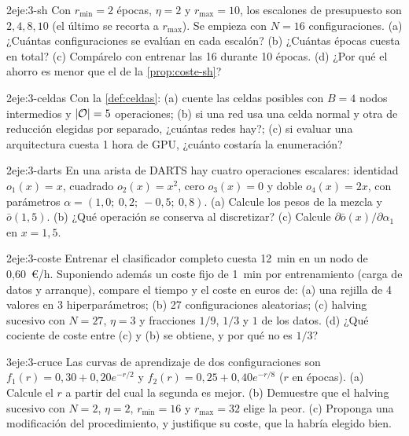 \begin{ejercicio}{2}{eje:3-sh}
Con $r_{\min}=2$ épocas, $\eta=2$ y $r_{\max}=10$, los escalones de presupuesto son $2,4,8,10$ (el último se recorta a $r_{\max}$). Se empieza con $N=16$ configuraciones. (a) ¿Cuántas configuraciones se evalúan en cada escalón? (b) ¿Cuántas épocas cuesta en total? (c) Compárelo con entrenar las 16 durante 10 épocas. (d) ¿Por qué el ahorro es menor que el de la \cref{prop:coste-sh}?
\end{ejercicio}

\begin{ejercicio}{2}{eje:3-celdas}
Con la \cref{def:celdas}: (a) cuente las celdas posibles con $B=4$ nodos intermedios y $\lvert\mathcal{O}\rvert=5$ operaciones; (b) si una red usa una celda normal y otra de reducción elegidas por separado, ¿cuántas redes hay?; (c) si evaluar una arquitectura cuesta 1 hora de GPU, ¿cuánto costaría la enumeración?
\end{ejercicio}

\begin{ejercicio}{2}{eje:3-darts}
En una arista de DARTS hay cuatro operaciones escalares: identidad $o_1(x)=x$, cuadrado $o_2(x)=x^{2}$, cero $o_3(x)=0$ y doble $o_4(x)=2x$, con parámetros $\alpha=(1{,}0;\ 0{,}2;\ -0{,}5;\ 0{,}8)$. (a) Calcule los pesos de la mezcla y $\bar o(1{,}5)$. (b) ¿Qué operación se conserva al discretizar? (c) Calcule $\partial\bar o(x)/\partial\alpha_1$ en $x=1{,}5$.
\end{ejercicio}

\begin{ejercicio}{2}{eje:3-coste}
Entrenar el clasificador completo cuesta 12~min en un nodo de 0{,}60~€/h. Suponiendo además un coste fijo de 1~min por entrenamiento (carga de datos y arranque), compare el tiempo y el coste en euros de: (a) una rejilla de 4 valores en 3 hiperparámetros; (b) 27 configuraciones aleatorias; (c) halving sucesivo con $N=27$, $\eta=3$ y fracciones $1/9$, $1/3$ y $1$ de los datos. (d) ¿Qué cociente de coste entre (c) y (b) se obtiene, y por qué no es $1/3$?
\end{ejercicio}

\begin{ejercicio}{3}{eje:3-cruce}
Las curvas de aprendizaje de dos configuraciones son $f_1(r)=0{,}30+0{,}20e^{-r/2}$ y $f_2(r)=0{,}25+0{,}40e^{-r/8}$ ($r$ en épocas). (a) Calcule el $r$ a partir del cual la segunda es mejor. (b) Demuestre que el halving sucesivo con $N=2$, $\eta=2$, $r_{\min}=16$ y $r_{\max}=32$ elige la peor. (c) Proponga una modificación del procedimiento, y justifique su coste, que la habría elegido bien.
\end{ejercicio}
